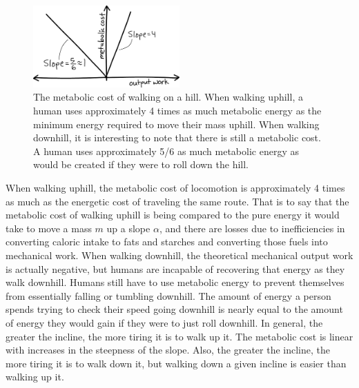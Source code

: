 \begin{figure}[htb]		%
\begin{centering}
\includegraphics[width=0.5\textwidth]{Figures/MetabolicCost}\par
\end{centering}
\caption[Plot: The Metabolic Cost of Walking on a Hill]{The metabolic cost of walking on a hill.  When walking uphill, a human uses approximately 4 times as much metabolic energy as the minimum energy required to move their mass uphill. When walking downhill, it is interesting to note that there is still a metabolic cost. A human uses approximately 5/6 as much metabolic energy as would be created if they were to roll down the hill.}
\label{fig:MetabolicCost}
\end{figure}
%

When walking uphill, the metabolic cost of locomotion is approximately 4 times as much as the energetic cost of traveling the same route. That is to say that the metabolic cost of walking uphill is being compared to the pure energy it would take to move a mass $m$ up a slope $\alpha$, and there are losses due to inefficiencies in converting caloric intake to fats and starches and converting those fuels into mechanical work. When walking downhill, the theoretical mechanical output work is actually negative, but humans are incapable of recovering that energy as they walk downhill. Humans still have to use metabolic energy to prevent themselves from essentially falling or tumbling downhill. The amount of energy a person spends trying to check their speed going downhill is nearly equal to the amount of energy they would gain if they were to just roll downhill. In general, the greater the incline, the more tiring it is to walk up it. The metabolic cost is linear with increases in the steepness of the slope. Also, the greater the incline, the more tiring it is to walk down it, but walking down a given incline is easier than walking up it. 


%
%

